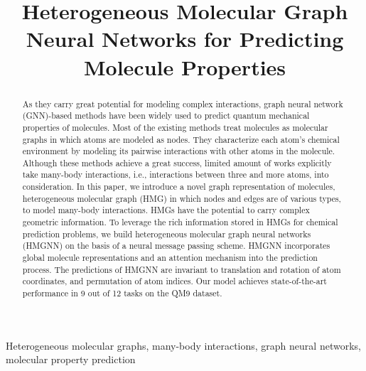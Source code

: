 \documentclass[conference]{IEEEtran}
\begin{document}
\title{Heterogeneous Molecular Graph Neural Networks for Predicting Molecule Properties
}

\author{
\and
{}
}

\maketitle

\begin{abstract}
As they carry great potential for modeling complex interactions, graph neural network (GNN)-based methods have been widely used to predict quantum mechanical properties of molecules. Most of the existing methods treat molecules as molecular graphs in which atoms are modeled as nodes. They characterize each atom's chemical environment by modeling its pairwise interactions with other atoms in the molecule. Although these methods achieve a great success, limited amount of works explicitly take many-body interactions, i.e., interactions between three and more atoms, into consideration. In this paper, we introduce a novel graph representation of molecules, heterogeneous molecular graph (HMG) in which nodes and edges are of various types, to model many-body interactions. HMGs have the potential to carry complex geometric information. To leverage the rich information stored in HMGs for chemical prediction problems, we build heterogeneous molecular graph neural networks (HMGNN) on the basis of a neural message passing scheme. HMGNN incorporates global molecule representations and an attention mechanism into the prediction process. The predictions of HMGNN are invariant to translation and rotation of atom coordinates, and permutation of atom indices. Our model achieves state-of-the-art performance in 9 out of 12 tasks on the QM9 dataset.
\end{abstract}

\begin{IEEEkeywords}
Heterogeneous molecular graphs, many-body interactions, graph neural networks, molecular property prediction
\end{IEEEkeywords}
\end{document}
